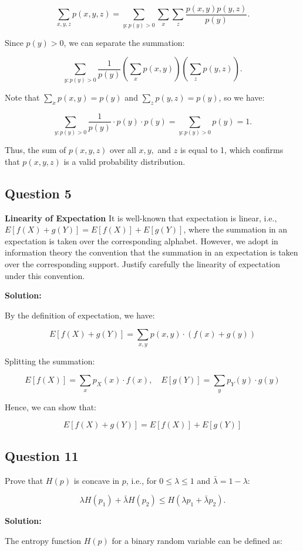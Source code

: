 \documentclass[a4paper,10pt]{article}
\begin{document}
$$
\sum_{x, y, z} p(x, y, z) = \sum_{y : p(y) > 0} \sum_{x} \sum_{z} \frac{p(x, y)p(y, z)}{p(y)}.
$$

Since $p(y) > 0$, we can separate the summation:

$$
\sum_{y : p(y) > 0} \frac{1}{p(y)} \left( \sum_{x} p(x, y) \right) \left( \sum_{z} p(y, z) \right).
$$

Note that $\sum_{x} p(x, y) = p(y)$ and $\sum_{z} p(y, z) = p(y)$, so we have:

$$
\sum_{y : p(y) > 0} \frac{1}{p(y)} \cdot p(y) \cdot p(y) = \sum_{y : p(y) > 0} p(y) = 1.
$$

Thus, the sum of $p(x, y, z)$ over all $x, y,$ and $z$ is equal to 1, which confirms that $p(x, y, z)$ is a valid probability distribution.

\subsection*{Question 5}
\textbf{Linearity of Expectation} It is well-known that expectation is linear, i.e., $E[f(X) + g(Y)] = E[f(X)] + E[g(Y)]$, where the summation in an expectation is taken over the corresponding alphabet. However, we adopt in information theory the convention that the summation in an expectation is taken over the corresponding support. Justify carefully the linearity of expectation under this convention.

\textbf{Solution:}

By the definition of expectation, we have:

$$
E[f(X) + g(Y)] = \sum_{x, y} p(x, y) \cdot (f(x) + g(y))
$$

Splitting the summation:

$$
E[f(X)] = \sum_{x} p_X(x) \cdot f(x), \quad E[g(Y)] = \sum_{y} p_Y(y) \cdot g(y)
$$

Hence, we can show that:

$$
E[f(X) + g(Y)] = E[f(X)] + E[g(Y)]
$$

\subsection*{Question 11}
Prove that $ H(p) $ is concave in $ p $, i.e., for $ 0 \leq \lambda \leq 1 $ and $ \bar{\lambda} = 1 - \lambda $:

$$
\lambda H(p_1) + \bar{\lambda} H(p_2) \leq H(\lambda p_1 + \bar{\lambda} p_2).
$$

\textbf{Solution:}

The entropy function $ H(p) $ for a binary random variable can be defined as:
\end{document}
